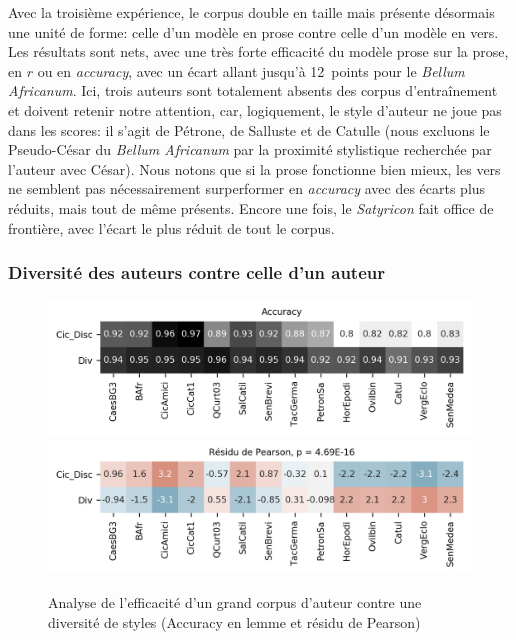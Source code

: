 Avec la troisième expérience, le corpus double en taille mais présente désormais une unité de forme: celle d'un modèle en prose contre celle d'un modèle en vers. Les résultats sont nets, avec une très forte efficacité du modèle prose sur la prose, en $r$ ou en \textit{accuracy}, avec un écart allant jusqu'à 12~points pour le \textit{Bellum Africanum}. Ici, trois auteurs sont totalement absents  des corpus d'entraînement et doivent retenir notre attention, car, logiquement, le style d'auteur ne joue pas dans les scores: il s'agit de Pétrone, de Salluste et de Catulle (nous excluons le Pseudo-César du \textit{Bellum Africanum} par la proximité stylistique recherchée par l'auteur avec César). Nous notons que si la prose fonctionne bien mieux, les vers ne semblent pas nécessairement surperformer en \textit{accuracy} avec des écarts plus réduits, mais tout de même présents. Encore une fois, le \textit{Satyricon} fait office de frontière, avec l'écart le plus réduit de tout le corpus.

\subsubsection{Diversité des auteurs contre celle d'un auteur}

\begin{figure}[ht]
    \centering
    \includegraphics[width=0.7\linewidth]{results/lemmatisation/longreeVariante/LongreeVariante-AccuracyDiversiteDAuteursContreDiversiteDAuteur-Lemme.png}
    \includegraphics[width=0.7\linewidth]{results/lemmatisation/longreeVariante/LongreeVariante-AssocPlotDiversiteDAuteursContreDiversiteDAuteur-Lemme.png}
    \caption{Analyse de l'efficacité d'un grand corpus d'auteur contre une diversité de styles (Accuracy en lemme et résidu de Pearson)}
    \label{fig:lemmatisation:longree:divAuteursVSTailleAuteur}
\end{figure}

